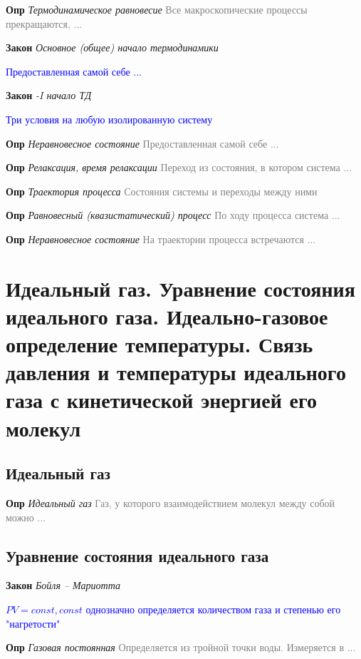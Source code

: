 \documentclass[a4paper, 14pt]{article}
\begin{document}
    \textbf{Опр} \textit{Термодинамическое равновесие} \textcolor{gray}{Все макроскопические процессы прекращаются, ...}

    \textbf{Закон} \textit{Основное (общее) начало термодинамики}

    \textcolor{blue}{Предоставленная самой себе ...}

    \textbf{Закон} \textit{-I начало ТД}

    \textcolor{blue}{Три условия на любую изолированную систему}

    \textbf{Опр} \textit{Неравновесное состояние} \textcolor{gray}{Предоставленная самой себе ...}

    \textbf{Опр} \textit{Релаксация, время релаксации} \textcolor{gray}{Переход из состояния, в котором система ...}

    \textbf{Опр} \textit{Траектория процесса} \textcolor{gray}{Состояния системы и переходы между ними}

    \textbf{Опр} \textit{Равновесный (квазистатический) процесс} \textcolor{gray}{По ходу процесса система ...}

    \textbf{Опр} \textit{Неравновесное состояние} \textcolor{gray}{На траектории процесса встречаются ...}

    \section{Идеальный газ.
    Уравнение состояния идеального газа.
    Идеально-газовое определение температуры.
    Связь давления и температуры идеального газа с кинетической энергией его молекул}

    \subsection{Идеальный газ}

    \textbf{Опр} \textit{Идеальный газ} \textcolor{gray}{Газ, у которого взаимодействием молекул между собой можно ...}

    \subsection{Уравнение состояния идеального газа}

    \textbf{Закон} \textit{Бойля -- Мариотта}

    \textcolor{blue}{$PV = const, const$ однозначно определяется количеством газа и степенью его "нагретости"}

    \textbf{Опр} \textit{Газовая постоянная} \textcolor{gray}{Определяется из тройной точки воды. Измеряется в ...}
\end{document}
